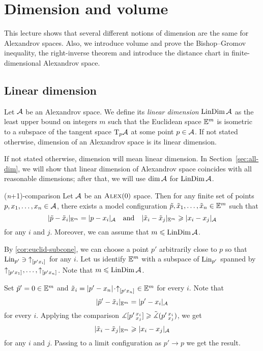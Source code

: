 \chapter{Dimension and volume}\label{chap:dim}

This lecture shows that several different notions of dimension are the same for Alexandrov spaces.
Also, we introduce volume and prove the Bishop--Gromov inequality, the right-inverse theorem and introduce the distance chart in finite-dimensional Alexandrov space.

\section{Linear dimension}

Let $\mathcal{A}$ be an Alexandrov space.
We define its \emph{linear dimension} \index{$\LinDim$}$\mathop{\rm LinDim}\nolimits \mathcal{A}$ as the least upper bound on integers $m$ such that 
the Euclidean space $\mathbb{E}^m$ is isometric to a subspace of the tangent space $\mathrm{T}_p\mathcal{A}$ at some point $p\in \mathcal{A}$.
If not stated otherwise, dimension of an Alexandrov space is its linear dimension.

If not stated otherwise, dimension will mean linear dimension.
In Section~\ref{sec:all-dim}, we will show that linear dimension of Alexandrov space coincides with all reasonable dimensions;
after that, we will use \index{$\dim$}$\operatorname{\rm dim}\nolimits\mathcal{A}$ for $\mathop{\rm LinDim}\nolimits\mathcal{A}$.

\begin{thm}{(\textit{n}+1)-comparison}\label{thm:n+1}
Let $\mathcal{A}$ be an $\textsc{Alex}(0)$ space.
Then for any finite set of points $p,x_1,\dots,x_n\in \mathcal{A}$, there exists a model configuration 
$\tilde p,\tilde x_1,\dots,\tilde x_n\in \mathbb{E}^m$ such that 
\[|\tilde p-\tilde x_i|_{\mathbb{E}^m}=| p- x_i|_{\mathcal{A}}
\quad\text{and}\quad
|\tilde x_i-\tilde x_j|_{\mathbb{E}^m}\geqslant |x_i- x_j|_{\mathcal{A}}\]
for any $i$ and $j$.
Moreover, we can assume that $m\leqslant \mathop{\rm LinDim}\nolimits\mathcal{A}$. 
\end{thm}

By \ref{cor:euclid-subcone}, we can choose a point $p'$ arbitrarily close to $p$ so that 
$\mathop{\rm Lin}\nolimits_{p'}\ni {\uparrow}_{[{p'}{x_i}]_{{}}}$ for any $i$.
Let us identify $\mathbb{E}^m$ with a subspace of $\mathop{\rm Lin}\nolimits_{p'}$ spanned by ${\uparrow}_{[{p'}{x_1}]_{{}}},\dots,{\uparrow}_{[{p'}{x_n}]_{{}}}$.
Note that $m\leqslant \mathop{\rm LinDim}\nolimits\mathcal{A}$.

Set $\tilde p'=0\in \mathbb{E}^m$ and $\tilde x_i=\dist{p'}{x_n}{}\cdot\dir{p'}{x_n}\in \EE^m$ for every $i$.
Note that 
\[|\tilde p'-\tilde x_i|_{\mathbb{E}^m}=| p'- x_i|_{\mathcal{A}}\]
for every $i$.
Applying the comparison $\measuredangle[p'\,{}^{x_i}_{x_j}]\geqslant \tilde\measuredangle(p'\,{}^{x_i}_{x_j})$, we get
\[|\tilde x_i-\tilde x_j|_{\mathbb{E}^m}\geqslant |x_i- x_j|_{\mathcal{A}}\]
for any $i$ and $j$.
Passing to a limit configuration as $p'\to p$ we get the result.
\qeds

